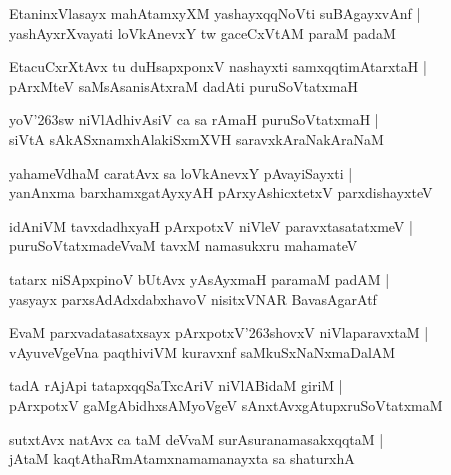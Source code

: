 \documentclass[twoside,12pt,openright]{book}
\def\S{\char'263}
\newcounter{shloka}[chapter]
\begin{document}
\begin{shloka}%
EtaninxVlasayx mahAtamxyXM yashayxqqNoVti suBAgayxvAnf |\\
yashAyxrXvayati loVkAnevxY tw gaceCxVtAM paraM padaM 
\end{shloka}

\begin{shloka}%
EtacuCxrXtAvx tu duHsapxponxV nashayxti samxqqtimAtarxtaH |\\
pArxMteV saMsAsanisAtxraM dadAti puruSoVtatxmaH 
\end{shloka}

\begin{shloka}%
yoV\S sw niVlAdhivAsiV ca sa rAmaH puruSoVtatxmaH |\\
siVtA sAkASxnamxhAlakiSxmXVH saravxkAraNakAraNaM 
\end{shloka}

\begin{shloka}%
yahameVdhaM caratAvx sa loVkAnevxY pAvayiSayxti |\\
yanAnxma barxhamxgatAyxyAH pArxyAshicxtetxV parxdishayxteV 
\end{shloka}

\begin{shloka}%
idAniVM tavxdadhxyaH pArxpotxV niVleV paravxtasatatxmeV |\\
puruSoVtatxmadeVvaM tavxM namasukxru mahamateV
\end{shloka}

\begin{shloka}%
tatarx niSApxpinoV bUtAvx yAsAyxmaH paramaM padAM |\\
yasyayx parxsAdAdxdabxhavoV nisitxVNAR BavasAgarAtf 
\end{shloka}

\begin{shloka}%
EvaM parxvadatasatxsayx pArxpotxV\S shovxV niVlaparavxtaM |\\
vAyuveVgeVna paqthiviVM kuravxnf saMkuSxNaNxmaDalAM 
\end{shloka}

\begin{shloka}%
tadA rAjApi tatapxqqSaTxcAriV niVlABidaM giriM |\\
pArxpotxV gaMgAbidhxsAMyoVgeV sAnxtAvxgAtupxruSoVtatxmaM 
\end{shloka}

\begin{shloka}%
sutxtAvx natAvx ca taM deVvaM surAsuranamasakxqqtaM |\\
jAtaM kaqtAthaRmAtamxnamamanayxta sa shaturxhA 
\end{shloka}
\end{document}
